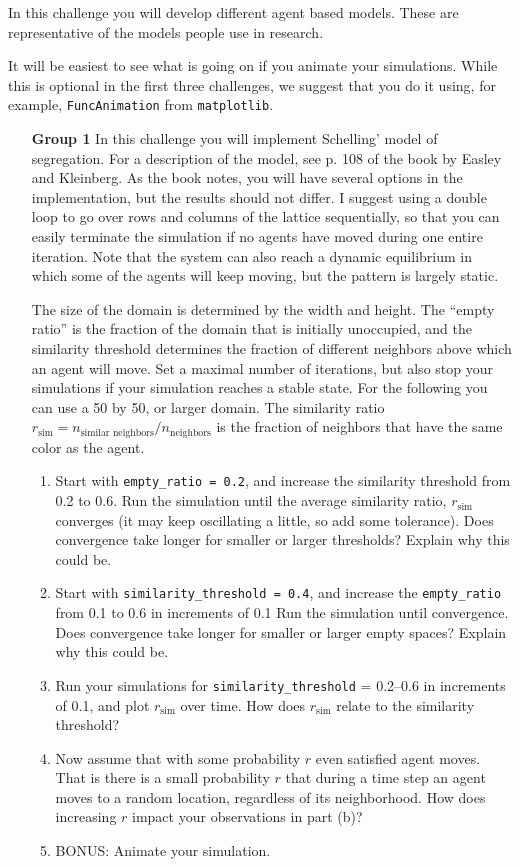 \documentclass[12pt]{article}
\begin{document}
In this challenge you will develop different agent based models.  These are representative of the
models people use in research.

It will be easiest to see what is going on if you animate  your simulations. While this is optional
in the first three challenges, we suggest that you do it using, for example, \verb|FuncAnimation| from \verb|matplotlib|.

\begin{enumerate}
\item[\bf Group 1]  In this challenge you will implement Schelling' model  of segregation.   
For a description of the model, see p. 108 of the book by Easley and Kleinberg.  As
the book notes, you will have several options in the implementation, but the results should
not differ.  I suggest using a double loop to go over rows and columns of the lattice sequentially, 
so that you can easily terminate the simulation if no agents have moved during one entire iteration.
Note that the system can also reach a dynamic equilibrium in which some of the agents will
keep moving, but the pattern is largely static.

The size of the domain is determined by the width and height. The ``empty ratio'' is the fraction of 
the domain that is initially unoccupied, and the similarity threshold determines the fraction of different neighbors above which 
an agent will move.  Set a maximal number of iterations, but also stop your simulations if your simulation
reaches a stable state. For the following you can use a 50 by 50, or larger domain.  The 
similarity ratio $r_{\text{sim}} = n_{\text{similar neighbors}}/n_{\text{neighbors}}$ is the fraction
of neighbors that have the same color as the agent.

\begin{enumerate}
\item  Start with \verb|empty_ratio = 0.2|, and increase the similarity threshold from 0.2 to 0.6.   
Run the simulation until the average similarity ratio, $r_{\text{sim}}$ converges (it may keep oscillating a little, so
add some tolerance).
Does convergence take longer for smaller or larger thresholds?  Explain why this could be.
\item  Start with \verb|similarity_threshold = 0.4|, and increase the \verb|empty_ratio| from 0.1 to 0.6 in increments of 0.1   
Run the simulation until convergence.  
Does convergence take longer for smaller or larger empty spaces?  Explain why this could be.
\item Run your simulations for  \verb|similarity_threshold| = 0.2--0.6 in increments of 0.1, and plot $r_{\text{sim}}$ over time.
How does  $r_{\text{sim}}$ relate to the similarity threshold?
\item Now assume that with some probability $r$ even satisfied agent moves.
That is there is a small probability $r$ that during a time step an agent moves to a random location, 
regardless of its neighborhood.  How does increasing $r$ impact your observations in part (b)?  
\item BONUS: Animate your simulation.
\end{enumerate}


\end{enumerate}
\end{document}
